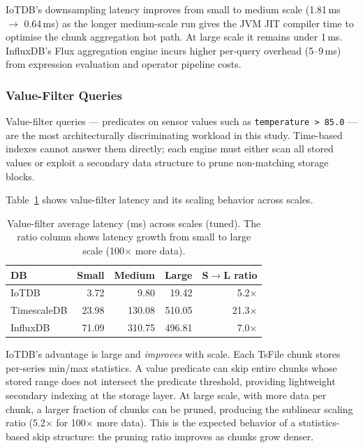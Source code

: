 IoTDB's downsampling latency improves from small to medium scale (1.81\,ms $\to$ 0.64\,ms)
as the longer medium-scale run gives the JVM JIT compiler time to optimise the chunk
aggregation hot path. At large scale it remains under 1\,ms. InfluxDB's Flux aggregation
engine incurs higher per-query overhead (5--9\,ms) from expression evaluation and operator
pipeline costs.

\subsubsection{Value-Filter Queries}

Value-filter queries --- predicates on sensor values such as \texttt{temperature > 85.0}
--- are the most architecturally discriminating workload in this study. Time-based indexes
cannot answer them directly; each engine must either scan all stored values or exploit
a secondary data structure to prune non-matching storage blocks.

Table~\ref{tab:vfilter} shows value-filter latency and its scaling behavior across scales.

\begin{table}[ht]
  \centering
  \caption{Value-filter average latency (ms) across scales (tuned).
           The ratio column shows latency growth from small to large scale (100$\times$ more data).}
  \label{tab:vfilter}
  \begin{tabular}{lrrrr}
    \hline
    \textbf{DB} & \textbf{Small} & \textbf{Medium} & \textbf{Large} & \textbf{S$\to$L ratio} \\
    \hline
    IoTDB       &   3.72 &    9.80 &   19.42 &  5.2$\times$ \\
    TimescaleDB &  23.98 &  130.08 &  510.05 & 21.3$\times$ \\
    InfluxDB    &  71.09 &  310.75 &  496.81 &  7.0$\times$ \\
    \hline
  \end{tabular}
\end{table}

IoTDB's advantage is large and \textit{improves} with scale. Each TsFile chunk stores
per-series min/max statistics. A value predicate can skip entire chunks whose stored range
does not intersect the predicate threshold, providing lightweight secondary indexing at
the storage layer. At large scale, with more data per chunk, a larger fraction of chunks
can be pruned, producing the sublinear scaling ratio (5.2$\times$ for 100$\times$ more data).
This is the expected behavior of a statistics-based skip structure: the pruning ratio
improves as chunks grow denser.

